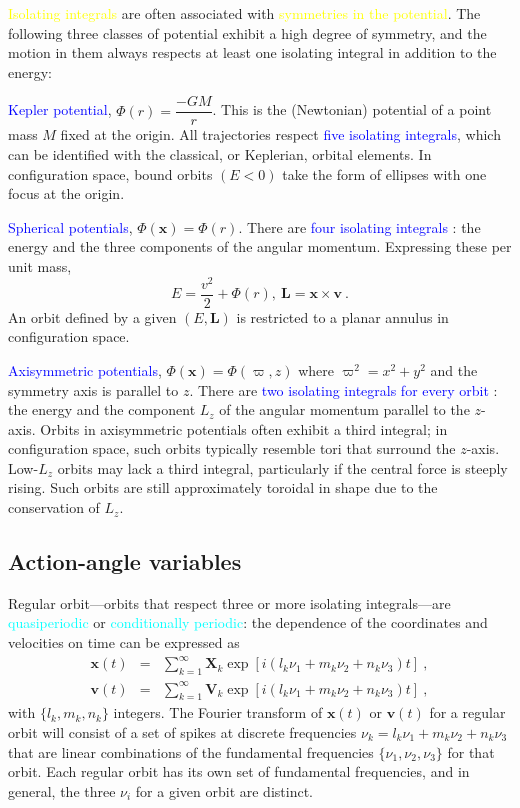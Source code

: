\documentclass[12pt,a4paper]{article}
\renewcommand{\vec}[1]{\boldsymbol{#1}}
\begin{document}
\textcolor{yellow}{Isolating integrals} are often associated with \textcolor{yellow}{symmetries in the potential}. The following three classes of potential exhibit a high degree of symmetry, and the motion in them always respects at least one isolating integral in addition to the energy:

\textcolor{blue}{Kepler potential}, $\Phi(r) = \dfrac{-GM}{r}$. This is the (Newtonian) potential of a point mass $M$ fixed at the origin. All trajectories respect \textcolor{blue}{five isolating integrals}, which can be identified with the classical, or Keplerian, orbital elements. In configuration space, bound orbits $(E < 0)$ take the form of ellipses with one focus at the origin.

\textcolor{blue}{Spherical potentials}, $\Phi(\vec{x}) = \Phi(r)$. There are \textcolor{blue}{four isolating integrals} : the energy and the three components of the angular momentum. Expressing these per unit mass,
\begin{equation}
E = \frac{v^2}{2} +\Phi(r), ~\vec{L} =\vec{x} \times \vec{v} ~. 
\end{equation}
An orbit defined by a given $(E, \vec{L})$ is restricted to a planar annulus in configuration space.

\textcolor{blue}{Axisymmetric potentials}, $\Phi(\vec{x}) =  \Phi(\varpi, z)$ where $\varpi^2 = x^2 + y^2$ and the
symmetry axis is parallel to $z$. There are \textcolor{blue}{two isolating integrals for every orbit} : the energy and the component $L_z$ of the angular momentum parallel to the $z$-axis. Orbits in axisymmetric potentials often exhibit a third integral; in configuration space, such orbits typically resemble tori that surround the $z$-axis. Low-$L_z$ orbits may lack a third integral, particularly if the central force is steeply rising. Such orbits are still approximately toroidal in shape due to the conservation of $L_z$.


\subsection{Action-angle variables}
Regular orbit---orbits that respect three or more isolating integrals---are \textcolor{cyan}{quasiperiodic} or \textcolor{cyan}{conditionally periodic}: the dependence of the coordinates and velocities on time can be expressed as
\begin{eqnarray}
\vec{x}(t) &=& \sum_{k=1}^\infty \vec{X}_k \exp [i(l_k \nu_1 + m_k \nu_2 +n_k \nu_3) t] ~, \\
\vec{v}(t) &=& \sum_{k=1}^\infty \vec{V}_k \exp [i(l_k \nu_1 + m_k \nu_2 +n_k \nu_3) t] ~,
\end{eqnarray}
with $\{l_k, m_k, n_k\}$ integers. The Fourier transform of $\vec{x}(t)$ or $\vec{v}(t)$ for a regular orbit will consist of a set of spikes at discrete frequencies $ν_k = l_k \nu_1 + m_k \nu_2 + n_k \nu_3$ that are linear combinations of the fundamental frequencies $\{\nu_1, \nu_2, \nu_3\}$ for that orbit. Each regular orbit has its own set of fundamental frequencies, and in general, the three $\nu_i$ for a given orbit are distinct.
\end{document}
